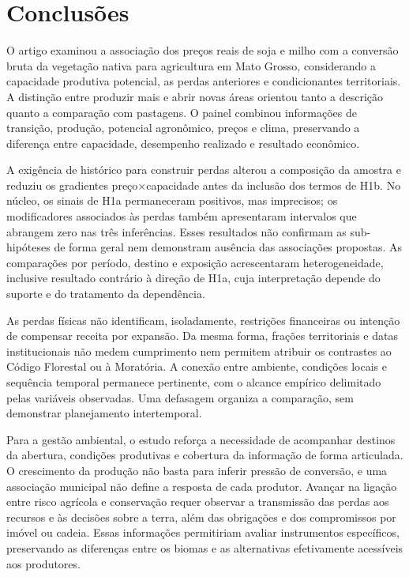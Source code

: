 \section{Conclusões}
\label{sec:conclusao}

O artigo examinou a associação dos preços reais de soja e milho com a conversão bruta da vegetação nativa para agricultura em Mato Grosso, considerando a capacidade produtiva potencial, as perdas anteriores e condicionantes territoriais. A distinção entre produzir mais e abrir novas áreas orientou tanto a descrição quanto a comparação com pastagens. O painel combinou informações de transição, produção, potencial agronômico, preços e clima, preservando a diferença entre capacidade, desempenho realizado e resultado econômico.

A exigência de histórico para construir perdas alterou a composição da amostra e reduziu os gradientes preço×capacidade antes da inclusão dos termos de H1b. No núcleo, os sinais de H1a permaneceram positivos, mas imprecisos; os modificadores associados às perdas também apresentaram intervalos que abrangem zero nas três inferências. Esses resultados não confirmam as sub-hipóteses de forma geral nem demonstram ausência das associações propostas. As comparações por período, destino e exposição acrescentaram heterogeneidade, inclusive resultado contrário à direção de H1a, cuja interpretação depende do suporte e do tratamento da dependência.

As perdas físicas não identificam, isoladamente, restrições financeiras ou intenção de compensar receita por expansão. Da mesma forma, frações territoriais e datas institucionais não medem cumprimento nem permitem atribuir os contrastes ao Código Florestal ou à Moratória. A conexão entre ambiente, condições locais e sequência temporal permanece pertinente, com o alcance empírico delimitado pelas variáveis observadas. Uma defasagem organiza a comparação, sem demonstrar planejamento intertemporal.

Para a gestão ambiental, o estudo reforça a necessidade de acompanhar destinos da abertura, condições produtivas e cobertura da informação de forma articulada. O crescimento da produção não basta para inferir pressão de conversão, e uma associação municipal não define a resposta de cada produtor. Avançar na ligação entre risco agrícola e conservação requer observar a transmissão das perdas aos recursos e às decisões sobre a terra, além das obrigações e dos compromissos por imóvel ou cadeia. Essas informações permitiriam avaliar instrumentos específicos, preservando as diferenças entre os biomas e as alternativas efetivamente acessíveis aos produtores.
